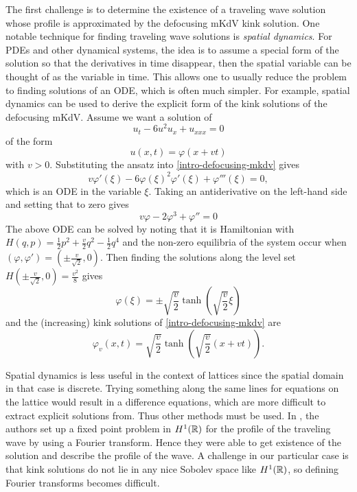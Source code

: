 The first challenge is to determine the existence of a traveling wave solution whose profile is approximated by the defocusing mKdV kink solution. One notable technique for finding traveling wave solutions is \emph{spatial dynamics}. For PDEs and other dynamical systems, the idea is to assume a special form of the solution so that the derivatives in time disappear, then the spatial variable can be thought of as the variable in time. This allows one to usually reduce the problem to finding solutions of an ODE, which is often much simpler. For example, spatial dynamics can be used to derive the explicit form of the kink solutions of the defocusing mKdV. Assume we want a solution of 
\begin{equation}\label{intro-defocusing-mkdv}
	u_t - 6u^2u_x + u_{xxx} = 0
\end{equation}
of the form
\begin{equation}
	u(x,t) = \varphi(x+vt) 
\end{equation}
with \(v > 0\). Substituting the ansatz into \cref{intro-defocusing-mkdv} gives
\begin{equation}
	v \varphi '(\xi) - 6\varphi(\xi)^2 \varphi'(\xi) + \varphi'''(\xi) = 0,
\end{equation}
which is an ODE in the variable \(\xi\). Taking an antiderivative on the left-hand side and setting that to zero gives
\begin{equation}
	v\varphi  - 2 \varphi^3  + \varphi'' = 0
\end{equation}
The above ODE can be solved by noting that it is Hamiltonian with \(H(q,p) = \frac 1 2 p^2 + \frac v 2 q^2 - \frac 12 q^4\) and the non-zero equilibria of the system occur when \((\varphi, \varphi') = (\pm \frac v {\sqrt 2}, 0)\). Then finding the solutions along the level set \(H(\pm \frac v {\sqrt 2}, 0) = \frac {v^2} 8\) gives 
\begin{equation}
	\varphi(\xi) = \pm \sqrt{\frac v  2} \tanh\left( \sqrt{\frac v 2} \xi\right)
\end{equation}
and the (increasing) kink solutions of \cref{intro-defocusing-mkdv} are
\begin{equation}
	\varphi_v(x,t) = \sqrt{\frac v 2} \tanh\left(\sqrt{\frac v 2} (x+vt) \right).
\end{equation}

Spatial dynamics is less useful in the context of lattices since the spatial domain in that case is discrete. Trying something along the same lines for equations on the lattice would result in a difference equations, which are more difficult to extract explicit solutions from. Thus other methods must be used. In \cite{friesecke1999solitary}, the authors set up a fixed point problem in \(H^1(\mathbb{R})\) for the profile of the traveling wave by using a Fourier transform. Hence they were able to get existence of the solution and describe the profile of the wave. A challenge in our particular case is that kink solutions do not lie in any nice Sobolev space like \(H^1(\mathbb{R})\), so defining Fourier transforms becomes difficult.

